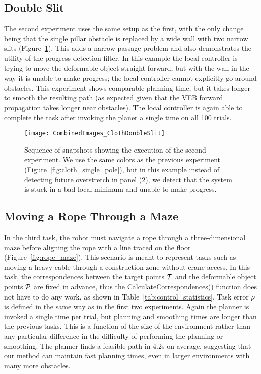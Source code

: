 \FloatBarrier

\subsection{Double Slit}
\label{sec:double_slit}
The second experiment uses the same setup as the first, with the only change being that the single pillar obstacle is replaced by a wide wall with two narrow slits (Figure~\ref{fig:cloth_double_slit}). This adds a narrow passage problem and also demonstrates the utility of the progress detection filter. In this example the local controller is trying to move the deformable object straight forward, but with the wall in the way it is unable to make progress; the local controller cannot explicitly go around obstacles. This experiment shows comparable planning time, but it takes longer to smooth the resulting path (as expected given that the VEB forward propagation takes longer near obstacles). The local controller is again able to complete the task after invoking the planer a single time on all 100 trials.

\begin{figure}[h]
    \centering
    \texttt{[image: CombinedImages\_ClothDoubleSlit]}
    \vspace{-0.2in}
    \caption{Sequence of snapshots showing the execution of the second experiment. We use the same colors as the previous experiment (Figure~\ref{fig:cloth_single_pole}), but in this example instead of detecting future overstretch in panel (2), we detect that the system is stuck in a bad local minimum and unable to make progress.}
    \label{fig:cloth_double_slit}
\end{figure}

\FloatBarrier

\subsection{Moving a Rope Through a Maze}
\label{sec:rope_maze}
In the third task, the robot must navigate a rope through a three-dimensional maze before aligning the rope with a line traced on the floor (Figure~\ref{fig:rope_maze}). This scenario is meant to represent tasks such as moving a heavy cable through a construction zone without crane access. In this task, the correspondences between the target points $\mathcal{T}$ and the deformable object points $\mathcal{P}$ are fixed in advance, thus the CalculateCorrespondences() function does not have to do any work, as shown in Table~\ref{tab:control_statistics}. Task error $\rho$ is defined in the same way as in the first two experiments. Again the planner is invoked a single time per trial, but planning and smoothing times are longer than the previous tasks. This is a function of the size of the environment rather than any particular difference in the difficulty of performing the planning or smoothing. The planner finds a feasible path in 4.2s on average, suggesting that our method can maintain fast planning times, even in larger environments with many more obstacles.

